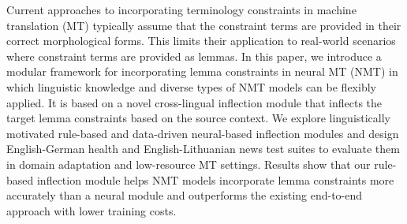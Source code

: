 Current approaches to incorporating terminology constraints in machine translation (MT) typically assume that the constraint terms are provided in their correct morphological forms. This limits their application to real-world scenarios where constraint terms are provided as lemmas. In this paper, we introduce a modular framework for incorporating lemma constraints in neural MT (NMT) in which linguistic knowledge and diverse types of NMT models can be flexibly applied. It is based on a novel cross-lingual inflection module that inflects the target lemma constraints based on the source context. We explore linguistically motivated rule-based and data-driven neural-based inflection modules and design English-German health and English-Lithuanian news test suites to evaluate them in domain adaptation and low-resource MT settings. Results show that our rule-based inflection module helps NMT models incorporate lemma constraints more accurately than a neural module and outperforms the existing end-to-end approach with lower training costs.
